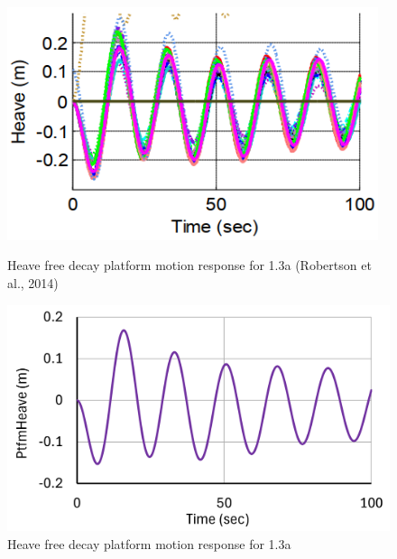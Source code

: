 \documentclass[a4paper, 11pt]{article}
\begin{document}
\begin{figure}[H]
    \begin{minipage}{0.48\textwidth}
        \centering
        \includegraphics[width=0.97\textwidth]{1.3a_heave.png}
        \caption{\small Heave free decay platform motion response for 1.3a (Robertson et al., 2014)}
        \label{fig:1.3a_heave}
    \end{minipage}
    \hfill
    \begin{minipage}{0.49\textwidth}
        \centering
        \includegraphics[width=1\textwidth]{1.3a_heave_mine.png}
        \caption{\small Heave free decay platform motion response for 1.3a}
        \label{fig:1.3a_heave_mine}
    \end{minipage}
\end{figure}
\end{document}
